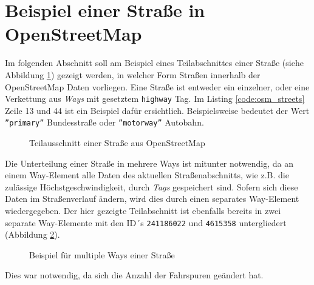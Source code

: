 \section{Beispiel einer Straße in OpenStreetMap}
\label{sec:appenix:osm:streets}
Im folgenden Abschnitt soll am Beispiel eines Teilabschnittes einer Straße (siehe Abbildung \ref{fig:osm_streets_1}) gezeigt werden, in welcher Form Straßen innerhalb der OpenStreetMap Daten vorliegen.
Eine Straße ist entweder ein einzelner, oder eine Verkettung aus \textit{Ways} mit gesetztem \texttt{highway} Tag.
Im Listing \ref{code:osm_streets} Zeile 13 und 44 ist ein Beispiel dafür ersichtlich. Beispielsweise bedeutet der Wert \texttt{''primary''} Bundesstraße oder \texttt{''motorway''} Autobahn.
\begin{figure}[htb]
  \centering
   \caption{Teilausschnitt einer Straße aus OpenStreetMap}
   \label{fig:osm_streets_1}
\end{figure}
Die Unterteilung einer Straße in mehrere Ways ist mitunter notwendig, da an einem Way-Element alle Daten des aktuellen Straßenabschnitts, wie z.B. die zulässige Höchstgeschwindigkeit, durch \textit{Tags} gespeichert sind. Sofern sich diese Daten im Straßenverlauf ändern, wird dies durch einen separates Way-Element wiedergegeben.
Der hier gezeigte Teilabschnitt ist ebenfalls bereits in zwei separate Way-Elemente mit den ID´s \texttt{241186022} und \texttt{4615358} untergliedert (Abbildung \ref{fig:osm_streets_2}).
\begin{figure}[htb]
  \centering
   \caption{Beispiel für multiple Ways einer Straße}
   \label{fig:osm_streets_2}
\end{figure}
Dies war notwendig, da sich die Anzahl der Fahrspuren geändert hat.
